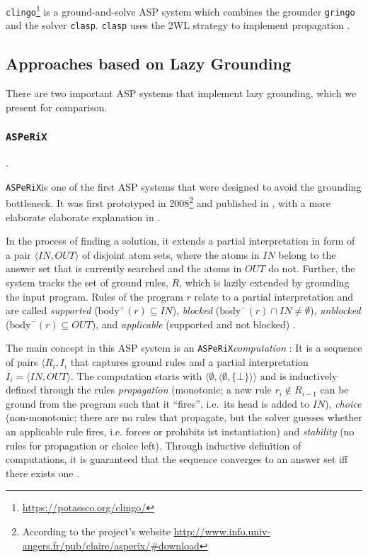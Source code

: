 \documentclass{vutinfth} %
\newcommand{\bodyf}{\mathrm{body}}
\newcommand{\asperix}{{\texttt{ASPeRiX}\xspace}}
\newcommand{\clasp}{\texttt{clasp}\xspace}
\begin{document}
\texttt{clingo}\footnote{\url{https://potassco.org/clingo/}} is a ground-and-solve ASP system which combines the grounder \texttt{gringo} and the solver \texttt{clasp}. \clasp uses the 2WL strategy to implement propagation \cite[Sec.~5.3]{clasp}.

\subsection{Approaches based on Lazy Grounding}

There are two important ASP systems that implement lazy grounding, which we present for comparison.

\subsubsection{\texttt{\asperix}}
\label{sec:asperix}.

\asperix is one of the first ASP systems that were designed to avoid the grounding bottleneck. It was first prototyped in 2008\footnote{According to the project's website \url{http://www.info.univ-angers.fr/pub/claire/asperix/\#download}} and published in \cite{asperixfirst}, with a more elaborate elaborate explanation in \cite{asperix}.

In the process of finding a solution, it extends a partial interpretation \cite[Def.~4]{asperix} in form of a pair $\langle IN, OUT \rangle$ of disjoint atom sets, where the atoms in $IN$ belong to the answer set that is currently searched and the atoms in $OUT$ do not. Further, the system tracks the set of ground rules, $R$, which is lazily extended by grounding the input program. Rules of the program $r$ relate to a partial interpretation and are called \emph{supported} ($\bodyf^+(r) \subseteq IN$), \emph{blocked} ($\bodyf^-(r) \cap IN \not = \emptyset$), \emph{unblocked} ($\bodyf^-(r) \subseteq OUT$), and \emph{applicable} (supported and not blocked) \cite[Def.~5]{asperix}. 

The main concept in this ASP system is an \asperix \emph{computation} \cite[Def.~7]{asperix}: It is a sequence of pairs $\langle R_i, I_i$ that captures ground rules and a partial interpretation $I_i = \langle IN, OUT \rangle$. The computation starts with $\langle \emptyset, \langle \emptyset, \{ \bot \} \rangle \rangle$ and is inductively defined through the rules \emph{propagation} (monotonic; a new rule $r_i \not \in R_{i-1}$ can be ground from the program such that it \enquote{fires}, i.e.~its head is added to $IN$), \emph{choice} (non-monotonic; there are no rules that propagate, but the solver guesses whether an applicable rule fires, i.e. forces or prohibits ist instantiation) and \emph{stability} (no rules for propagation or choice left). Through inductive definition of computations, it is guaranteed that the sequence converges to an answer set iff there exists one \cite[Thm.~2]{asperix}.
\end{document}
